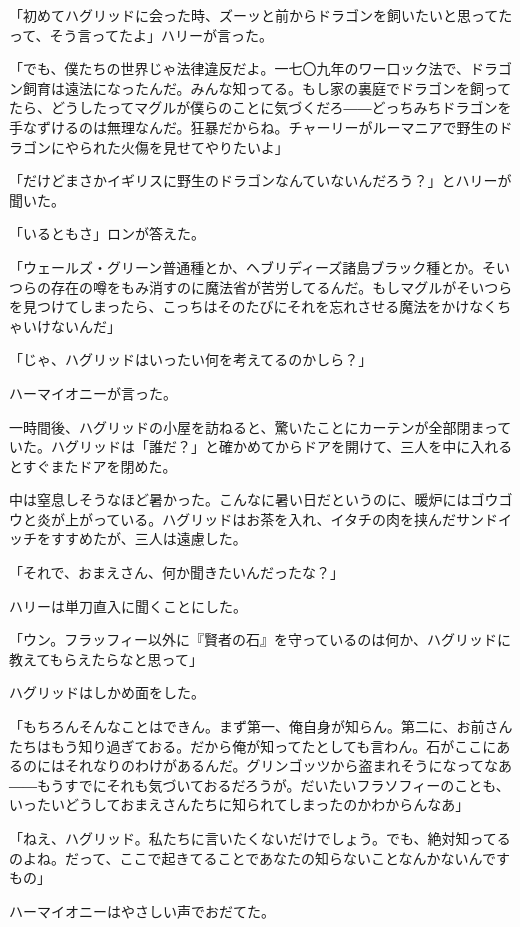 \documentclass[10pt,a4paper]{article}
\begin{document}
\begin{CJK}{UTF8}{min}
「初めてハグリッドに会った時、ズーッと前からドラゴンを飼いたいと思ってたって、そう言ってたよ」ハリーが言った。

「でも、僕たちの世界じゃ法律違反だよ。一七〇九年のワー口ック法で、ドラゴン飼育は遠法になったんだ。みんな知ってる。もし家の裏庭でドラゴンを飼ってたら、どうしたってマグルが僕らのことに気づくだろ――どっちみちドラゴンを手なずけるのは無理なんだ。狂暴だからね。チャーリーがルーマニアで野生のドラゴンにやられた火傷を見せてやりたいよ」

「だけどまさかイギリスに野生のドラゴンなんていないんだろう？」とハリーが聞いた。

「いるともさ」ロンが答えた。

「ウェールズ・グリーン普通種とか、ヘブリディーズ諸島ブラック種とか。そいつらの存在の噂をもみ消すのに魔法省が苦労してるんだ。もしマグルがそいつらを見つけてしまったら、こっちはそのたびにそれを忘れさせる魔法をかけなくちゃいけないんだ」

「じゃ、ハグリッドはいったい何を考えてるのかしら？」

ハーマイオニーが言った。



一時間後、ハグリッドの小屋を訪ねると、驚いたことにカーテンが全部閉まっていた。ハグリッドは「誰だ？」と確かめてからドアを開けて、三人を中に入れるとすぐまたドアを閉めた。

中は窒息しそうなほど暑かった。こんなに暑い日だというのに、暖炉にはゴウゴウと炎が上がっている。ハグリッドはお茶を入れ、イタチの肉を挟んだサンドイッチをすすめたが、三人は遠慮した。

「それで、おまえさん、何か聞きたいんだったな？」

ハリーは単刀直入に聞くことにした。

「ウン。フラッフィー以外に『賢者の石』を守っているのは何か、ハグリッドに教えてもらえたらなと思って」

ハグリッドはしかめ面をした。

「もちろんそんなことはできん。まず第一、俺自身が知らん。第二に、お前さんたちはもう知り過ぎておる。だから俺が知ってたとしても言わん。石がここにあるのにはそれなりのわけがあるんだ。グリンゴッツから盗まれそうになってなあ――もうすでにそれも気づいておるだろうが。だいたいフラソフィーのことも、いったいどうしておまえさんたちに知られてしまったのかわからんなあ」

「ねえ、ハグリッド。私たちに言いたくないだけでしょう。でも、絶対知ってるのよね。だって、ここで起きてることであなたの知らないことなんかないんですもの」

ハーマイオニーはやさしい声でおだてた。


\end{CJK}
\end{document}

